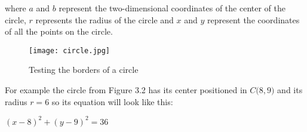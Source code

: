 where $a$ and $b$ represent the two-dimensional coordinates of the center of the circle, $r$ represents the radius of the circle and $x$ and $y$ represent the coordinates of all the points on the circle.\\

\begin{figure}[h]
	\caption{Testing the borders of a circle}
	\centering
	\texttt{[image: circle.jpg]}
\end{figure}

For example the circle from Figure 3.2 has its center positioned in $C\big(8, 9\big)$ and its radius $r = 6$ so its equation will look like this:

\begin{center}
	$(x - 8) ^ 2 + (y - 9) ^ 2 = 36$
\end{center}